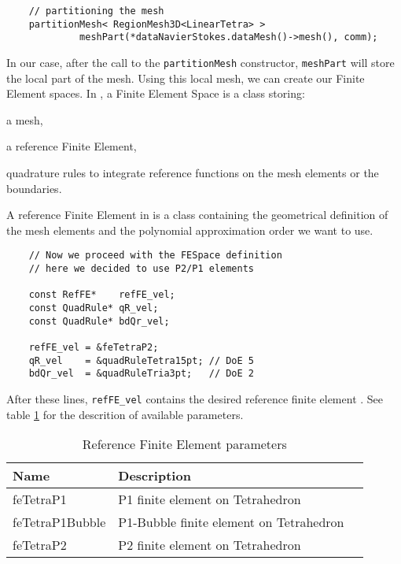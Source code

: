 \begin{verbatim}
    // partitioning the mesh
    partitionMesh< RegionMesh3D<LinearTetra> >
             meshPart(*dataNavierStokes.dataMesh()->mesh(), comm);
\end{verbatim}

In our case, after the call to the \verb!partitionMesh! constructor, \verb!meshPart! will store
the local part of the mesh. Using this local mesh, 
we can create our Finite Element  spaces.
In \lifev, a Finite Element Space is a class storing:
\begin{description}
\item a mesh,
\item a reference Finite Element,
\item quadrature rules to integrate reference functions on the mesh elements or the boundaries.
\end{description}

A reference Finite Element in \lifev is a class containing the geometrical definition
of the mesh elements and the polynomial approximation order we want to use.

\begin{verbatim}
    // Now we proceed with the FESpace definition
    // here we decided to use P2/P1 elements

    const RefFE*    refFE_vel;
    const QuadRule* qR_vel;
    const QuadRule* bdQr_vel;

    refFE_vel = &feTetraP2;
    qR_vel    = &quadRuleTetra15pt; // DoE 5
    bdQr_vel  = &quadRuleTria3pt;   // DoE 2

\end{verbatim}

After these lines, \verb!refFE_vel! contains the desired reference finite element  
. See table \ref{table-feapproxorder}
for the descrition of available parameters.

\begin{table}
\begin{center}
\begin{tabular}{|l|l|l|}
\hline
Name  & Description \\
\hline \hline
feTetraP1 & P1 finite element on Tetrahedron \\
feTetraP1Bubble & P1-Bubble finite element on Tetrahedron \\
feTetraP2 & P2 finite element on Tetrahedron \\
\hline
\end{tabular}
\end{center}
\caption{ Reference Finite Element parameters}
\label{table-feapproxorder}
\end{table}


